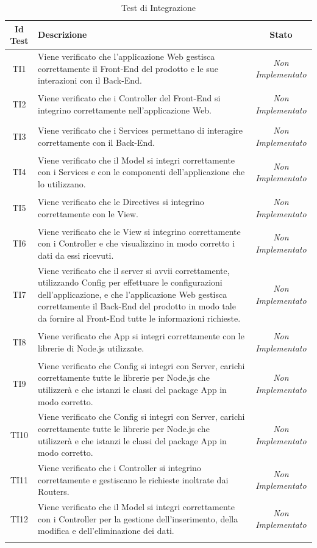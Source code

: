 \normalsize
\begin{longtable}[ht]{|c|>{}m{8cm}|c|}
\hline 
\textbf{Id Test} & \textbf{Descrizione} & \textbf{Stato}\\
\hline
\endhead
\hypertarget{TI1}{TI1} & Viene verificato che l’applicazione Web gestisca
correttamente il Front-End del prodotto e le sue interazioni
con il Back-End. & \textit{Non Implementato}\\ \hline
\hypertarget{TI2}{TI2} & Viene verificato che i Controller del Front-End si integrino
correttamente nell’applicazione Web. & \textit{Non Implementato}\\ \hline
\hypertarget{TI3}{TI3} & Viene verificato che i Services permettano di interagire
correttamente con il Back-End. & \textit{Non Implementato}\\ \hline
\hypertarget{TI4}{TI4} & Viene verificato che il Model si integri correttamente con i
Services e con le componenti dell’applicazione che lo
utilizzano. & \textit{Non Implementato}\\ \hline
\hypertarget{TI5}{TI5} & Viene verificato che le Directives si integrino correttamente
con le View. & \textit{Non Implementato}\\ \hline
\hypertarget{TI6}{TI6} & Viene verificato che le View si integrino correttamente con i
Controller e che visualizzino in modo corretto i dati da essi
ricevuti. & \textit{Non Implementato}\\ \hline
\hypertarget{TI7}{TI7} & Viene verificato che il server si avvii correttamente,
utilizzando Config per effettuare le configurazioni
dell’applicazione, e che l’applicazione Web gestisca
correttamente il Back-End del prodotto in modo tale da
fornire al Front-End tutte le informazioni richieste. & \textit{Non Implementato}\\ \hline
\hypertarget{TI8}{TI8} & Viene verificato che App si integri correttamente con le
librerie di Node.js utilizzate. & \textit{Non Implementato}\\ \hline
\hypertarget{TI9}{TI9} & Viene verificato che Config si integri con Server, carichi
correttamente tutte le librerie per Node.js che utilizzerà e
che istanzi le classi del package App in modo corretto. & \textit{Non Implementato}\\ \hline
\hypertarget{TI10}{TI10} & Viene verificato che Config si integri con Server, carichi
correttamente tutte le librerie per Node.js che utilizzerà e
che istanzi le classi del package App in modo corretto. & \textit{Non Implementato}\\ \hline
\hypertarget{TI11}{TI11} & Viene verificato che i Controller si integrino correttamente
e gestiscano le richieste inoltrate dai Routers. & \textit{Non Implementato}\\ \hline
\hypertarget{TI12}{TI12} & Viene verificato che il Model si integri correttamente con i
Controller per la gestione dell’inserimento, della modifica e
dell’eliminazione dei dati. & \textit{Non Implementato}\\ \hline
\caption[Test di Integrazione]{Test di Integrazione}
\label{tabella:test2}
\end{longtable}
\FloatBarrier
